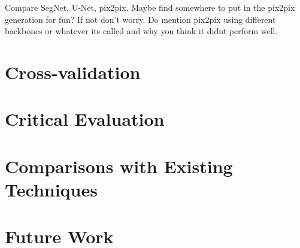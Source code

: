 Compare SegNet, U-Net, pix2pix. Maybe find somewhere to put in the pix2pix generation for fun? If not don't worry. Do mention pix2pix using different backbones or whatever its called and why you think it didnt perform well.

\section{Cross-validation}
\label{sec:evalcrossval}

\section{Critical Evaluation}

\section{Comparisons with Existing Techniques}

\section{Future Work}




